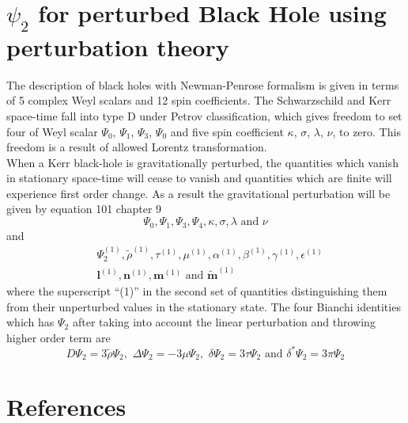\documentclass[prd,preprintnumbers,onecolumn,eqsecnum,floatfix,letter]{revtex4}
\begin{document}
\section{$\psi_{2}$ for perturbed Black Hole using perturbation theory}
The description of black holes with Newman-Penrose formalism is given in terms of 5 complex Weyl scalars and 12 spin coefficients. The Schwarzschild and Kerr space-time fall into type D under Petrov classification, which gives freedom to set four of Weyl scalar $\Psi_0$, $\Psi_1$, $\Psi_3$, $\Psi_0$ and five spin coefficient $\kappa$, $\sigma$, $\lambda$, $\nu$,  to zero. This freedom is a result of allowed Lorentz transformation. \\
When a Kerr black-hole is gravitationally perturbed, the quantities which vanish in stationary space-time will cease to vanish and quantities which are finite will experience first order change. As a result the gravitational perturbation will be given by equation 101 chapter 9 \cite{Chandrasekhar:579245}      
\begin{equation}
\Psi_0, \Psi_1, \Psi_3, \Psi_4, \kappa, \sigma, \lambda \, \, \text{and} \, \,\nu
\end{equation}
and 
\begin{align}
&\Psi_{2}^{\left(1\right)}, \tilde{\rho}^{\left(1\right)}, \tau^{\left(1\right)}, \mu^{\left(1\right)}, \alpha^{\left(1\right)}, \beta^{\left(1\right)}, \gamma^{\left(1\right)}, \epsilon^{\left(1\right)} \nonumber \\
&\boldsymbol{l}^{\left(1\right)}, \boldsymbol{n}^{\left(1\right)}, \boldsymbol{m}^{\left(1\right)} \,\, \text{and} \,\, \boldsymbol{\tilde{m}}^{\left(1\right)}
\end{align}
where the superscript ``(1)'' in the second set of quantities distinguishing them from their unperturbed values in the stationary state. The four Bianchi identities which has $\Psi_{2}$ after taking into account the linear perturbation and throwing higher order term are 
\begin{equation}
D\Psi_{2} = 3\tilde{\rho}\Psi_{2}, \,\, \Delta\Psi_{2} = -3\mu\Psi_{2},  \,\, \delta\Psi_{2} = 3\tau\Psi_{2} \,\, \text{and} \,\, \delta^{*}\Psi_{2} = 3\pi\Psi_{2}
\end{equation}  
\section*{References}



\end{document}
